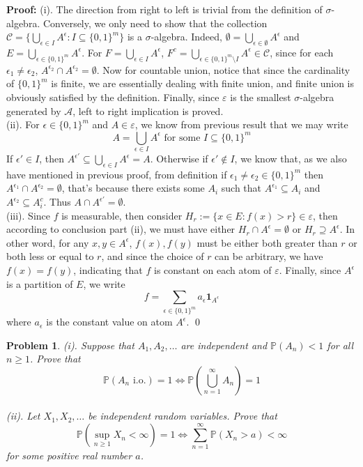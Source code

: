 \documentclass[12pt]{article}
\newtheorem{problem}{Problem}
\begin{document}
\textbf{Proof:} (i). The direction from right to left is trivial from the definition of $\sigma$-algebra. Conversely, we only need to show that the collection $\mathcal{C}=\{\bigcup_{\epsilon\in I}A^\epsilon: I\subseteq\{0,1\}^m\}$ is a $\sigma$-algebra. Indeed, $\emptyset=\bigcup_{\epsilon\in\emptyset}A^\epsilon$ and $E=\bigcup_{\epsilon\in\{0,1\}^m} A^\epsilon$. For $F=\bigcup_{\epsilon\in I}A^{\epsilon}$, $F^c=\bigcup_{\epsilon\in\{0,1\}^m\setminus I}A^\epsilon\in\mathcal{C}$, since for each $\epsilon_1\neq\epsilon_2$, $A^{\epsilon_2}\cap A^{\epsilon_2}=\emptyset$. Now for countable union, notice that since the cardinality of $\{0,1\}^m$ is finite, we are essentially dealing with finite union, and finite union is obviously satisfied by the definition. Finally, since $\varepsilon$ is the smallest $\sigma$-algebra generated by $\mathcal{A}$, left to right implication is proved. \\
\indent (ii). For $\epsilon\in\{0,1\}^m$ and $A\in\varepsilon$, we know from previous result that we may write
$$
    A=\bigcup_{\epsilon\in I} A^\epsilon \text{ for some } I\subseteq\{0,1\}^m
$$
If $\epsilon'\in I$, then $A^{\epsilon'}\subseteq\bigcup\limits_{\epsilon\in I}A^\epsilon=A$. Otherwise if $\epsilon'\notin I$, we know that, as we also have mentioned in previous proof, from definition if $\epsilon_1\neq\epsilon_2\in \{0, 1\}^m$ then $A^{\epsilon_1}\cap A^{\epsilon_2}=\emptyset$, that's because there exists some $A_i$ such that $A^{\epsilon_1}\subseteq A_i$ and $A^{\epsilon_2}\subseteq A_i^c$. Thus $A\cap A^{\epsilon'}=\emptyset$. \\
\indent (iii). Since $f$ is measurable, then consider $H_r:=\{x\in E: f(x)>r\}\in\varepsilon$, then according to conclusion part (ii), we must have either $H_{r}\cap A^\epsilon=\emptyset$ or $H_{r}\supseteq A^\epsilon$. In other word, for any $x,y\in A^\epsilon$, $f(x),f(y)$ must be either both greater than $r$ or both less or equal to $r$, and since the choice of $r$ can be arbitrary, we have $f(x)=f(y)$, indicating that $f$ is constant on each atom of $\varepsilon$. Finally, since $A^\epsilon$ is a partition of $E$, we write 
$$
    f=\sum\limits_{\epsilon\in\{0,1\}^m}a_\epsilon\textbf{1}_{A^\epsilon}
$$
where $a_\epsilon$ is the constant value on atom $A^\epsilon$. \qed
\\
\begin{problem}
    (i). Suppose that $A_1, A_2, \dots$ are independent and $\mathbb{P}(A_n)<1$ for all $n\geq 1$. Prove that 
    $$
        \mathbb{P}(A_n\text{ i.o.})=1 \iff \mathbb{P}\left(\bigcup_{n=1}^\infty A_n\right)=1
    $$ \\
    (ii). Let $X_1, X_2, \dots$ be independent random variables. Prove that 
    $$
        \mathbb{P}\left(\sup_{n\geq 1}X_n<\infty\right)=1 \iff \sum\limits_{n=1}^\infty\mathbb{P}(X_n>a)<\infty
    $$
    for some positive real number $a$.
\end{problem}
\end{document}
